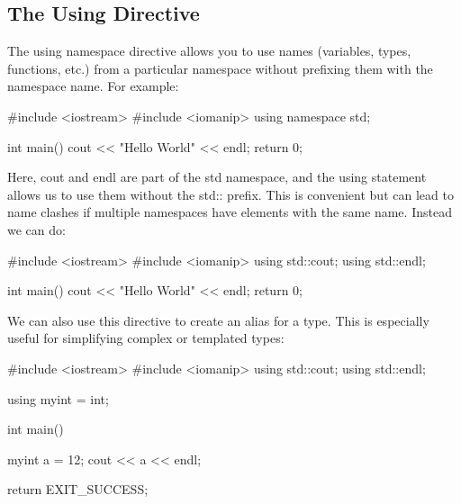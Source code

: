 \documentclass{report}
\begin{document}
    




    \pagebreak
    \subsection{The Using Directive}
    \bigbreak \noindent 
    The using namespace directive allows you to use names (variables, types, functions, etc.) from a particular namespace without prefixing them with the namespace name. For example:
    \bigbreak \noindent 
    
    \begin{cppcode}
#include <iostream>
#include <iomanip>
using namespace std;

int main(){
    cout << "Hello World" << endl;
    return 0;
}
    \end{cppcode}
    
    \bigbreak \noindent 
    Here, cout and endl are part of the std namespace, and the using statement allows us to use them without the std:: prefix. This is convenient but can lead to name clashes if multiple namespaces have elements with the same name. Instead we can do:
    \bigbreak \noindent 
    
    \begin{cppcode}
#include <iostream>
#include <iomanip>
using std::cout;
using std::endl;

int main(){
    cout << "Hello World" << endl;
    return 0;
}
    \end{cppcode}
    
    \bigbreak \noindent 
    We can also use this directive to create an alias for a type. This is especially useful for simplifying complex or templated types:
    \bigbreak \noindent 
    
    \begin{cppcode}
#include <iostream>
#include <iomanip>
using std::cout;
using std::endl;

using myint = int;

int main() {
    
    myint a = 12;
    cout << a << endl;

    return EXIT_SUCCESS;
}
    \end{cppcode}
    
\end{document}

